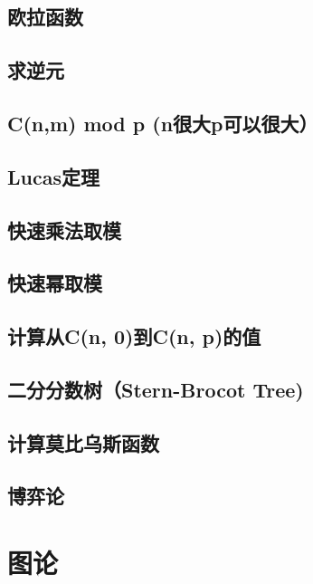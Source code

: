 \section{欧拉函数}
\raggedbottom
\hrulefill
\section{求逆元}
\raggedbottom
\hrulefill
\section{C(n,m) mod p (n很大p可以很大）}
\raggedbottom
\hrulefill
\section{Lucas定理}
\raggedbottom
\hrulefill
\section{快速乘法取模}
\raggedbottom
\hrulefill
\section{快速幂取模}
\raggedbottom
\hrulefill
\section{计算从C(n, 0)到C(n, p)的值}
\raggedbottom
\hrulefill
\section{二分分数树（Stern-Brocot Tree)}
\raggedbottom
\hrulefill
\section{计算莫比乌斯函数}
\raggedbottom
\hrulefill
\section{博弈论}
\raggedbottom
\hrulefill

\chapter{图论}
